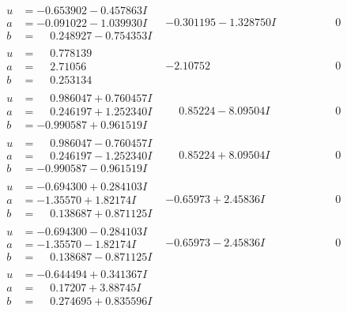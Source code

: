 \documentclass[1p]{elsarticle_modified}
\theoremstyle{definition}
\begin{document}
$$\begin{array}{c|c|c}
\begin{aligned}
u &= -0.653902 - 0.457863 I \\
a &= -0.091022 - 1.039930 I \\
b &= \phantom{-}0.248927 - 0.754353 I\end{aligned}
 & -0.301195 - 1.328750 I & \phantom{-0.000000 } 0 \\ \hline\begin{aligned}
u &= \phantom{-}0.778139\phantom{ +0.000000I} \\
a &= \phantom{-}2.71056\phantom{ +0.000000I} \\
b &= \phantom{-}0.253134\phantom{ +0.000000I}\end{aligned}
 & -2.10752\phantom{ +0.000000I} & \phantom{-0.000000 } 0 \\ \hline\begin{aligned}
u &= \phantom{-}0.986047 + 0.760457 I \\
a &= \phantom{-}0.246197 + 1.252340 I \\
b &= -0.990587 + 0.961519 I\end{aligned}
 & \phantom{-}0.85224 - 8.09504 I & \phantom{-0.000000 } 0 \\ \hline\begin{aligned}
u &= \phantom{-}0.986047 - 0.760457 I \\
a &= \phantom{-}0.246197 - 1.252340 I \\
b &= -0.990587 - 0.961519 I\end{aligned}
 & \phantom{-}0.85224 + 8.09504 I & \phantom{-0.000000 } 0 \\ \hline\begin{aligned}
u &= -0.694300 + 0.284103 I \\
a &= -1.35570 + 1.82174 I \\
b &= \phantom{-}0.138687 + 0.871125 I\end{aligned}
 & -0.65973 + 2.45836 I & \phantom{-0.000000 } 0 \\ \hline\begin{aligned}
u &= -0.694300 - 0.284103 I \\
a &= -1.35570 - 1.82174 I \\
b &= \phantom{-}0.138687 - 0.871125 I\end{aligned}
 & -0.65973 - 2.45836 I & \phantom{-0.000000 } 0 \\ \hline\begin{aligned}
u &= -0.644494 + 0.341367 I \\
a &= \phantom{-}0.17207 + 3.88745 I \\
b &= \phantom{-}0.274695 + 0.835596 I\end{aligned}

\end{array}$$
\end{document}
